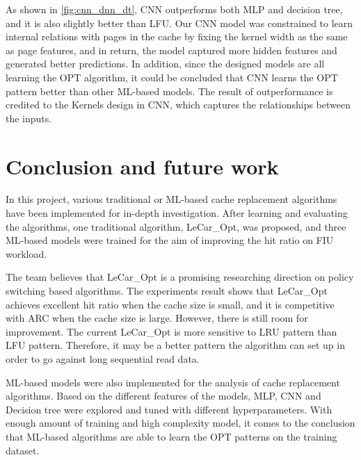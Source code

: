 \documentclass[letterpaper,twocolumn,10pt]{article}
\begin{document}
As shown in \ref{fig:cnn_dnn_dt}, CNN outperforms both MLP and decision tree, and it is also slightly better than LFU. Our CNN model was constrained to learn internal relations with pages in the cache by fixing the kernel width as the same as page features, and in return, the model captured more hidden features and generated better predictions. In addition, since the designed models are all learning the OPT algorithm, it could be concluded that CNN learns the OPT pattern better than other ML-based models.  The result of outperformance is credited to the Kernels\cite{schmidhuber2015deep} design in CNN, which captures the relationships between the inputs.  


\section{Conclusion and future work}


In this project, various traditional or ML-based cache replacement algorithms have been implemented for in-depth investigation. After learning and evaluating the algorithms, one traditional algorithm, LeCar\_Opt, was proposed,  and three ML-based models were trained for the aim of improving the hit ratio on FIU workload. 

The team believes that LeCar\_Opt is a promising researching direction on policy switching based algorithms. The experiments result shows that LeCar\_Opt achieves excellent hit ratio when the cache size is small, and it is competitive with ARC when the cache size is large. However, there is still room for improvement. The current LeCar\_Opt is more sensitive to LRU pattern than LFU pattern. Therefore, it may be a better pattern the algorithm can set up in order to go against long sequential read data. 

ML-based models were also implemented for the analysis of cache replacement algorithms. Based on the different features of the models, MLP, CNN and Decision tree were explored and tuned with different hyperparameters. With enough amount of training and high complexity model,  it comes to the conclusion that ML-based algorithms are able to learn the OPT patterns on the training dataset. 














\end{document}
